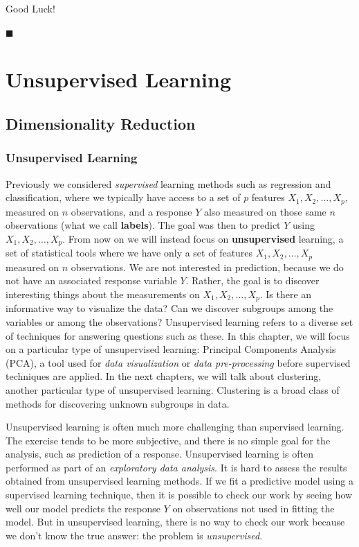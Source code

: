 \documentclass[]{book}
\begin{document}
Good Luck!

◼

\part{Unsupervised
Learning}\label{part-unsupervised-learning}

\chapter{Dimensionality Reduction}\label{dimensionality-reduction}

\section{Unsupervised Learning}\label{unsupervised-learning-1}

Previously we considered \emph{supervised} learning methods such as
regression and classification, where we typically have access to a set
of \(p\) features \(X_1,X_2,\ldots,X_p\), measured on \(n\)
observations, and a response \(Y\) also measured on those same \(n\)
observations (what we call \textbf{labels}). The goal was then to
predict \(Y\) using \(X_1,X_2,\ldots,X_p\). From now on we will instead
focus on \textbf{unsupervised} learning, a set of statistical tools
where we have only a set of features \(X_1,X_2,\ldots,X_p\) measured on
\(n\) observations. We are not interested in prediction, because we do
not have an associated response variable \(Y\). Rather, the goal is to
discover interesting things about the measurements on
\(X_1,X_2,\ldots,X_p\). Is there an informative way to visualize the
data? Can we discover subgroups among the variables or among the
observations? Unsupervised learning refers to a diverse set of
techniques for answering questions such as these. In this chapter, we
will focus on a particular type of unsupervised learning: Principal
Components Analysis (PCA), a tool used for \emph{data visualization} or
\emph{data pre-processing} before supervised techniques are applied. In
the next chapters, we will talk about clustering, another particular
type of unsupervised learning. Clustering is a broad class of methods
for discovering unknown subgroups in data.

Unsupervised learning is often much more challenging than supervised
learning. The exercise tends to be more subjective, and there is no
simple goal for the analysis, such as prediction of a response.
Unsupervised learning is often performed as part of an \emph{exploratory
data analysis}. It is hard to assess the results obtained from
unsupervised learning methods. If we fit a predictive model using a
supervised learning technique, then it is possible to check our work by
seeing how well our model predicts the response \(Y\) on observations
not used in fitting the model. But in unsupervised learning, there is no
way to check our work because we don't know the true answer: the problem
is \emph{unsupervised}.
\end{document}
